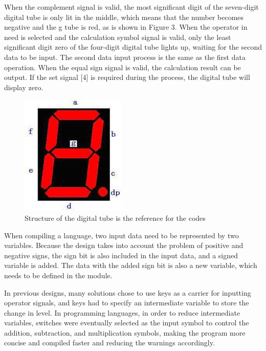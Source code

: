 \documentclass[11pt,journal,compsoc]{IEEEtran}
\begin{document}
When the complement signal is valid, the most significant digit of the seven-digit digital tube is only lit in the middle, which means that the number becomes negative and the g tube is red, as is shown in Figure 3. When the operator in need is selected and the calculation symbol signal is valid, only the least significant digit zero of the four-digit digital tube lights up, waiting for the second data to be input. The second data input process is the same as the first data operation. When the equal sign signal is valid, the calculation result can be output. If the set signal [4] is required during the process, the digital tube will display zero. 

\begin{figure}[H]
	\centering
	\includegraphics[width=5cm]{fig4}
	\caption{Structure of the digital tube is the reference for the codes}
	\label{Fig4}
\end{figure}
When compiling a language, two input data need to be represented by two variables. Because the design takes into account the problem of positive and negative signs, the sign bit is also included in the input data, and a signed variable is added. The data with the added sign bit is also a new variable, which needs to be defined in the module. 

In previous designs, many solutions chose to use keys as a carrier for inputting operator signals, and keys had to specify an intermediate variable to store the change in level. In programming languages, in order to reduce intermediate variables, switches were eventually selected as the input symbol to control the addition, subtraction, and multiplication symbols, making the program more concise and compiled faster and reducing the warnings accordingly.
\end{document}
